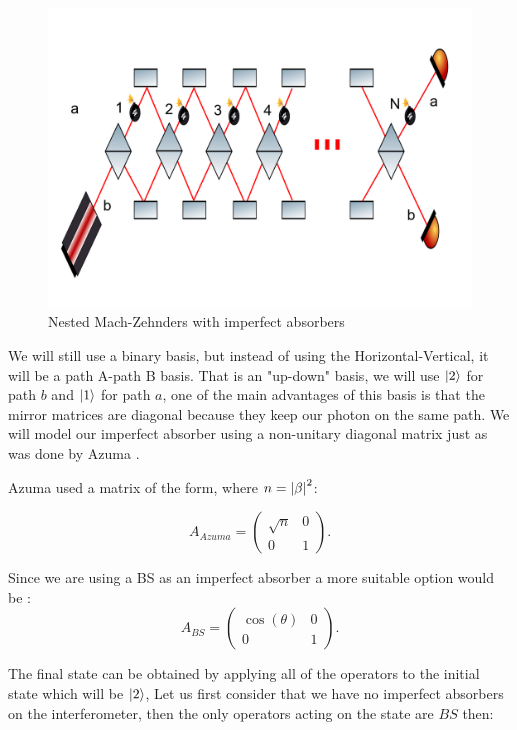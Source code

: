 \documentclass[12pt]{book}
\begin{document}
\begin{figure}[!htb]
\centering
\includegraphics[width=\linewidth]{images/nmach.png}
\caption{Nested Mach-Zehnders  with imperfect absorbers}
\label{fig:BS2}
\end{figure}
 
 We will still use a binary basis, but instead of using the Horizontal-Vertical, it will be a path A-path B basis. That is an "up-down" basis, we will use $\ket{2}$ for path $b$ and $\ket{1}$ for path $a$, one of the main advantages of this basis is that the mirror matrices are diagonal because they keep our photon on the same path. We will model our imperfect absorber using a non-unitary diagonal matrix just as was done by  Azuma \cite{Azuma}.   
 
 Azuma used a matrix of the form, where $n=\abs{\beta}^{2}$:
 
 \begin{equation}
 A_{Azuma}=\begin{pmatrix} \sqrt{n} & 0\\0& 1\end{pmatrix}.
 \end{equation}

Since we are using a BS as an imperfect absorber a more suitable option would be :
\begin{equation}
 A_{BS}=\begin{pmatrix} \cos(\theta) & 0\\0& 1\end{pmatrix}.
\end{equation}

The final state can be obtained by applying all of the operators to the initial state which will be $\ket{2}$, Let us first consider that we have no imperfect absorbers on the interferometer, then the only operators acting on the state are $BS$ then:
\end{document}
